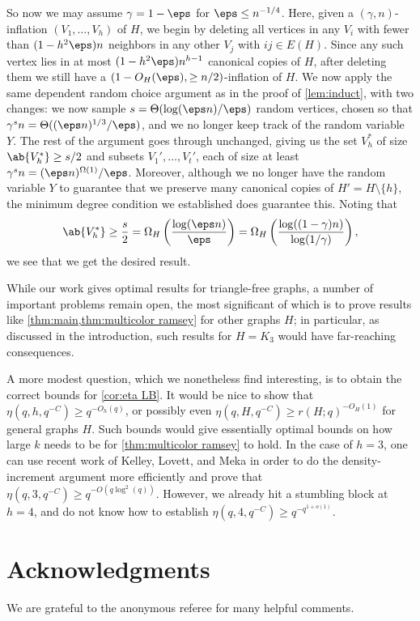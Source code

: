 So now we may assume $\gamma = 1-\eps $ for $ \eps \le n^{-1/4}$. Here, given a $(\gamma,n)$-inflation $(V_1,\dots,V_h)$ of $H$, we begin by deleting all vertices in any $V_i$ with fewer than $(1-h^2\eps)n$ neighbors in any other $V_j$ with $ij \in E(H)$. Since any such vertex lies in at most $(1-h^2\eps) n^{h-1}$ canonical copies of $H$, after deleting them we still have a $(1-O_H(\eps), \geq n/2)$-inflation of $H$. We now apply the same dependent random choice argument as in the proof of \cref{lem:induct}, with two changes: we now sample $s = \Theta(\log(\eps n)/\eps)$ random vertices, chosen so that $\gamma^s n = \Theta((\eps n)^{1/3}/\eps)$, and we no longer keep track of the random variable $Y$. The rest of the argument goes through unchanged, giving us the set $V_h^*$ of size $\ab{V_h^*}\geq s/2$ and subsets $V_1',\dots,V_t'$, each of size at least $\gamma^s n = (\eps n)^{\Omega(1)}/\eps$. Moreover, although we no longer have the random variable $Y$ to guarantee that we preserve many canonical copies of $H' = H \setminus \{h\}$, the minimum degree condition we established does guarantee this. Noting that
\[
\ab{V_h^*} \geq \frac s2 = \Omega_H \left(\frac{\log(\eps n)}{\eps}\right) = \Omega_H \left( \frac{\log((1-\gamma)n)}{\log(1/\gamma)}\right),
\]
we see that we get the desired result.

While our work gives optimal results for triangle-free graphs, a number of important problems remain open,
the most significant of which is to prove results like \cref{thm:main,thm:multicolor ramsey} for other graphs $H$; in particular, as discussed in the introduction, such results for $H=K_3$ would have far-reaching consequences.

A more modest question, which we nonetheless find interesting, is to obtain the  correct bounds for \cref{cor:eta LB}. It would be nice to show that $\eta(q,h, q^{-C})\geq q^{-O_h(q)}$, or possibly even $\eta(q, H, q^{-C})\geq r(H;q)^{-O_H(1)}$ for general graphs $H$. Such bounds would give essentially optimal bounds on how large $k$ needs to be for \cref{thm:multicolor ramsey} to hold. In the case of $h=3$, one can use recent work of Kelley, Lovett, and Meka \cite{2308.12451} in order to do the density-increment argument more efficiently and prove that $\eta(q,3,q^{-C})\geq q^{-O(q\log^2(q))}$. However, we already hit a stumbling block at $h=4$, and do not know how to establish $\eta(q,4,q^{-C})\geq q^{-q^{1+o(1)}}$.

\section*{Acknowledgments} We are grateful to the anonymous referee for many helpful comments.